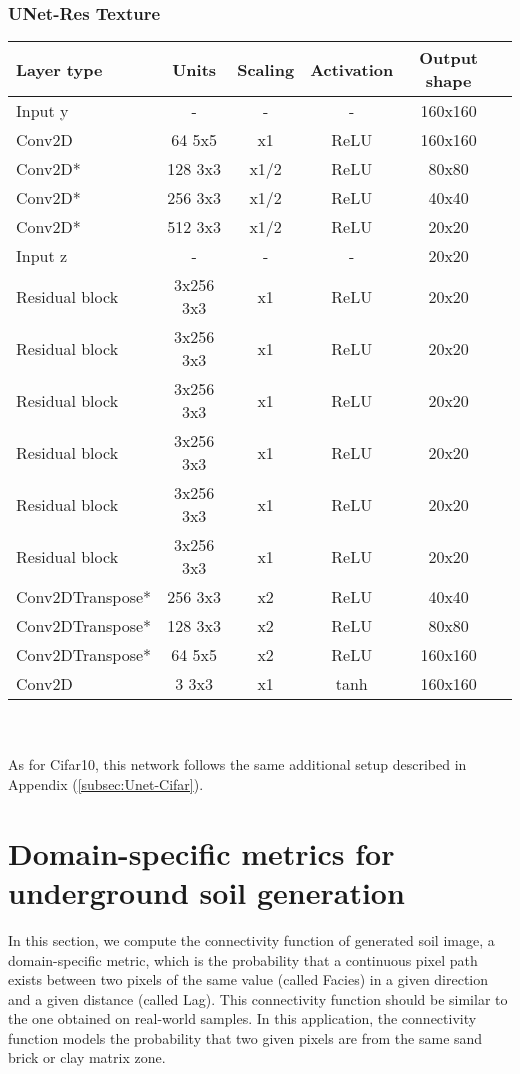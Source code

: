 {\subsubsection{UNet-Res Texture} 
{
	\centering
	\begin{tabular}{|l|c|c|c|c|c|}
		\hline
		Layer type & Units & Scaling & Activation & Output shape\\
		\hline
		Input y & - & - & - & 160x160\\
		Conv2D & 64 5x5 & x1 & ReLU & 160x160 \\
		Conv2D* & 128 3x3 & x1/2 & ReLU & 80x80 \\
		Conv2D* & 256 3x3 & x1/2 & ReLU & 40x40 \\
		Conv2D* & 512 3x3 & x1/2 & ReLU & 20x20 \\
		Input z & - & - & - & 20x20 \\
		Residual block & 3x256 3x3 & x1 & ReLU & 20x20 \\
		Residual block & 3x256 3x3 & x1 & ReLU & 20x20 \\
		Residual block & 3x256 3x3 & x1 & ReLU & 20x20 \\
		Residual block & 3x256 3x3 & x1 & ReLU & 20x20 \\
		Residual block & 3x256 3x3 & x1 & ReLU & 20x20 \\
		Residual block & 3x256 3x3 & x1 & ReLU & 20x20 \\
		Conv2DTranspose* & 256 3x3 & x2 & ReLU & 40x40 \\
		Conv2DTranspose* & 128 3x3 & x2 & ReLU & 80x80 \\
		Conv2DTranspose* & 64 5x5 & x2 & ReLU & 160x160 \\
		Conv2D & 3 3x3 & x1 & tanh & 160x160 \\
		\hline
	\end{tabular}
}\\~\\
\noindent
As for Cifar10, this network follows the same additional setup described in Appendix (\ref{subsec:Unet-Cifar}).

\section{Domain-specific metrics for underground soil generation}
\label{app:geostatistics}

In this section, we compute the connectivity function \cite{Lemmens2017} of generated soil image, a domain-specific metric, which is the probability that a continuous pixel path exists between two pixels of the same value (called Facies) in a given direction and a given distance (called Lag). This connectivity function should be similar to the one obtained on real-world samples. In this application, the connectivity function models the probability that two given pixels are from the same sand brick or clay matrix zone.

}
